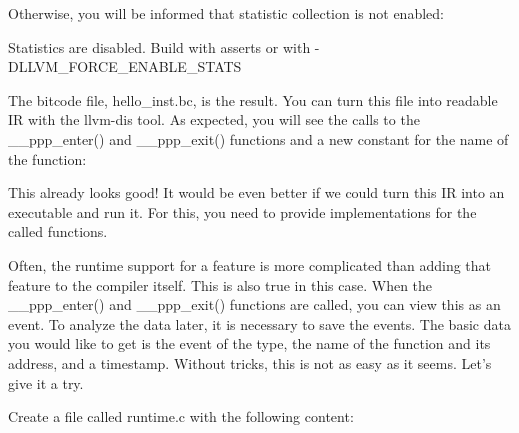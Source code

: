 Otherwise, you will be informed that statistic collection is not enabled:

\begin{shell}
Statistics are disabled. Build with asserts or with
-DLLVM_FORCE_ENABLE_STATS
\end{shell}

The bitcode file, hello\_inst.bc, is the result. You can turn this file into readable IR with the llvm-dis tool. As expected, you will see the calls to the \_\_ppp\_enter() and \_\_ppp\_exit() functions and a new constant for the name of the function:


This already looks good! It would be even better if we could turn this IR into an executable and run it. For this, you need to provide implementations for the called functions.

Often, the runtime support for a feature is more complicated than adding that feature to the compiler itself. This is also true in this case. When the \_\_ppp\_enter() and \_\_ppp\_exit() functions are called, you can view this as an event. To analyze the data later, it is necessary to save the events. The basic data you would like to get is the event of the type, the name of the function and its address, and a timestamp. Without tricks, this is not as easy as it seems. Let’s give it a try.

Create a file called runtime.c with the following content:

